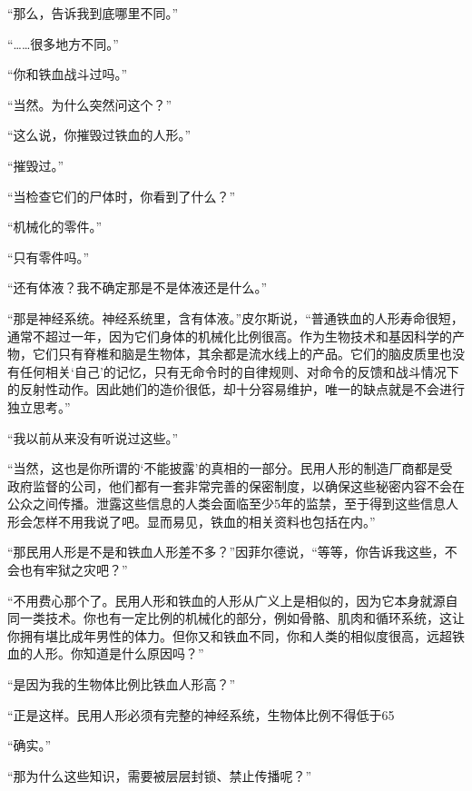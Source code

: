“那么，告诉我到底哪里不同。”

“……很多地方不同。”

“你和铁血战斗过吗。”

“当然。为什么突然问这个？”

“这么说，你摧毁过铁血的人形。”

“摧毁过。”

“当检查它们的尸体时，你看到了什么？”

“机械化的零件。”

“只有零件吗。”

“还有体液？我不确定那是不是体液还是什么。”

“那是神经系统。神经系统里，含有体液。”皮尔斯说，“普通铁血的人形寿命很短，通常不超过一年，因为它们身体的机械化比例很高。作为生物技术和基因科学的产物，它们只有脊椎和脑是生物体，其余都是流水线上的产品。它们的脑皮质里也没有任何相关‘自己’的记忆，只有无命令时的自律规则、对命令的反馈和战斗情况下的反射性动作。因此她们的造价很低，却十分容易维护，唯一的缺点就是不会进行独立思考。”

“我以前从来没有听说过这些。”

“当然，这也是你所谓的‘不能披露’的真相的一部分。民用人形的制造厂商都是受政府监督的公司，他们都有一套非常完善的保密制度，以确保这些秘密内容不会在公众之间传播。泄露这些信息的人类会面临至少5年的监禁，至于得到这些信息人形会怎样不用我说了吧。显而易见，铁血的相关资料也包括在内。”

“那民用人形是不是和铁血人形差不多？”因菲尔德说，“等等，你告诉我这些，不会也有牢狱之灾吧？”

“不用费心那个了。民用人形和铁血的人形从广义上是相似的，因为它本身就源自同一类技术。你也有一定比例的机械化的部分，例如骨骼、肌肉和循环系统，这让你拥有堪比成年男性的体力。但你又和铁血不同，你和人类的相似度很高，远超铁血的人形。你知道是什么原因吗？”

“是因为我的生物体比例比铁血人形高？”

“正是这样。民用人形必须有完整的神经系统，生物体比例不得低于65%

“确实。”

“那为什么这些知识，需要被层层封锁、禁止传播呢？”

